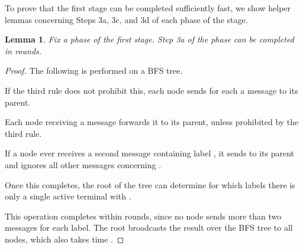 \documentclass[letterpaper,11pt]{article}
\newtheorem{lemma}[theorem]{Lemma}
\begin{document}
To prove that the first stage can be completed sufficiently fast, we show
helper lemmas concerning Steps 3a, 3c, and 3d of each phase of the stage.

\begin{lemma}\label{lemma:stage1_3a}
Fix a phase  of the first stage. Step 3a of the phase can
be completed in  rounds.
\end{lemma}
\begin{proof}
The following is performed on a BFS tree.
\begin{compactitem}
\item If the third rule does not prohibit this, each node sends for each
 a message  to its parent.
\item Each node receiving a message forwards it to its parent, unless prohibited
by the third rule.
\item If a node ever receives a second message containing label
, it sends  to its parent and ignores all other messages
concerning .
\item Once this completes, the root of the tree can determine for which labels
 there is only a single active terminal  with
.
\end{compactitem}
This operation completes within  rounds, since no node sends more than
two messages for each label. The root broadcasts the result over the BFS tree to
all nodes, which also takes time .
\end{proof}
\end{document}
